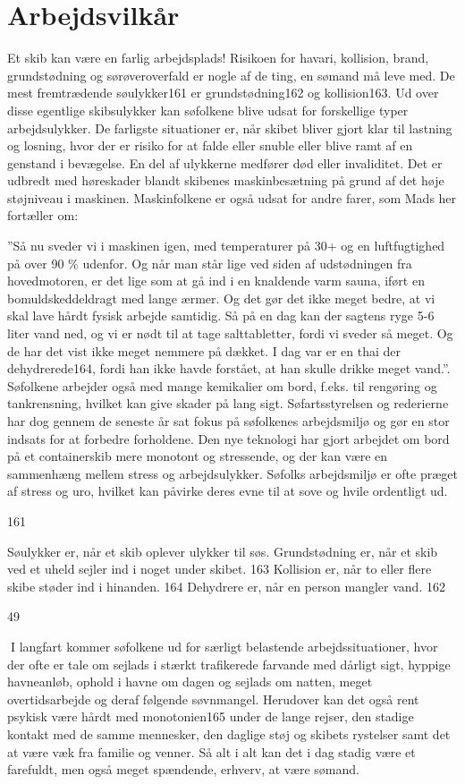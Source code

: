 \chapter{Arbejdsvilkår}\label{arbejdsvilkuxe5r}

Et skib kan være en farlig arbejdsplads! Risikoen for havari, kollision,
brand, grundstødning og sørøveroverfald er nogle af de ting, en sømand
må leve med. De mest fremtrædende søulykker161 er grundstødning162 og
kollision163. Ud over disse egentlige skibsulykker kan søfolkene blive
udsat for forskellige typer arbejdsulykker. De farligste situationer er,
når skibet bliver gjort klar til lastning og losning, hvor der er risiko
for at falde eller snuble eller blive ramt af en genstand i bevægelse.
En del af ulykkerne medfører død eller invaliditet. Det er udbredt med
høreskader blandt skibenes maskinbesætning på grund af det høje
støjniveau i maskinen. Maskinfolkene er også udsat for andre farer, som
Mads her fortæller om:

''Så nu sveder vi i maskinen igen, med temperaturer på 30+ og en
luftfugtighed på over 90 \% udenfor. Og når man står lige ved siden af
udstødningen fra hovedmotoren, er det lige som at gå ind i en knaldende
varm sauna, iført en bomuldskeddeldragt med lange ærmer. Og det gør det
ikke meget bedre, at vi skal lave hårdt fysisk arbejde samtidig. Så på
en dag kan der sagtens ryge 5-6 liter vand ned, og vi er nødt til at
tage salttabletter, fordi vi sveder så meget. Og de har det vist ikke
meget nemmere på dækket. I dag var er en thai der dehydrerede164, fordi
han ikke havde forstået, at han skulle drikke meget vand.''. Søfolkene
arbejder også med mange kemikalier om bord, f.eks. til rengøring og
tankrensning, hvilket kan give skader på lang sigt. Søfartsstyrelsen og
rederierne har dog gennem de seneste år sat fokus på søfolkenes
arbejdsmiljø og gør en stor indsats for at forbedre forholdene. Den nye
teknologi har gjort arbejdet om bord på et containerskib mere monotont
og stressende, og der kan være en sammenhæng mellem stress og
arbejdsulykker. Søfolks arbejdsmiljø er ofte præget af stress og uro,
hvilket kan påvirke deres evne til at sove og hvile ordentligt ud.

161

Søulykker er, når et skib oplever ulykker til søs. Grundstødning er, når
et skib ved et uheld sejler ind i noget under skibet. 163 Kollision er,
når to eller flere skibe støder ind i hinanden. 164 Dehydrere er, når en
person mangler vand. 162

49

I langfart kommer søfolkene ud for særligt belastende
arbejdssituationer, hvor der ofte er tale om sejlads i stærkt
trafikerede farvande med dårligt sigt, hyppige havneanløb, ophold i
havne om dagen og sejlads om natten, meget overtidsarbejde og deraf
følgende søvnmangel. Herudover kan det også rent psykisk være hårdt med
monotonien165 under de lange rejser, den stadige kontakt med de samme
mennesker, den daglige støj og skibets rystelser samt det at være væk
fra familie og venner. Så alt i alt kan det i dag stadig være et
farefuldt, men også meget spændende, erhverv, at være sømand.
